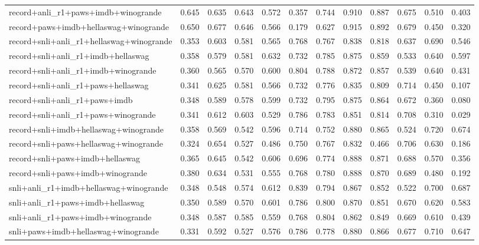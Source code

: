 \begin{table}[t]
\begin{tabular}{lrrrrrrrrrrr}
    record+anli\_r1+paws+imdb+winogrande & 0.645 & 0.635 & 0.643 & 0.572 & 0.357 & 0.744 & 0.910 & 0.887 & 0.675 & 0.510 & 0.403 \\
    record+paws+imdb+hellaswag+winogrande & 0.650 & 0.677 & 0.646 & 0.566 & 0.179 & 0.627 & 0.915 & 0.892 & 0.679 & 0.450 & 0.320 \\
    record+snli+anli\_r1+hellaswag+winogrande & 0.353 & 0.603 & 0.581 & 0.565 & 0.768 & 0.767 & 0.838 & 0.818 & 0.637 & 0.690 & 0.546 \\
    record+snli+anli\_r1+imdb+hellaswag & 0.358 & 0.579 & 0.581 & 0.632 & 0.732 & 0.785 & 0.875 & 0.859 & 0.533 & 0.640 & 0.597 \\
    record+snli+anli\_r1+imdb+winogrande & 0.360 & 0.565 & 0.570 & 0.600 & 0.804 & 0.788 & 0.872 & 0.857 & 0.539 & 0.640 & 0.431 \\
    record+snli+anli\_r1+paws+hellaswag & 0.341 & 0.625 & 0.581 & 0.566 & 0.732 & 0.776 & 0.835 & 0.809 & 0.714 & 0.450 & 0.107 \\
    record+snli+anli\_r1+paws+imdb & 0.348 & 0.589 & 0.578 & 0.599 & 0.732 & 0.795 & 0.875 & 0.864 & 0.672 & 0.360 & 0.080 \\
    record+snli+anli\_r1+paws+winogrande & 0.341 & 0.612 & 0.603 & 0.529 & 0.786 & 0.783 & 0.851 & 0.814 & 0.708 & 0.310 & 0.029 \\
    record+snli+imdb+hellaswag+winogrande & 0.358 & 0.569 & 0.542 & 0.596 & 0.714 & 0.752 & 0.880 & 0.865 & 0.524 & 0.720 & 0.674 \\
    record+snli+paws+hellaswag+winogrande & 0.324 & 0.654 & 0.527 & 0.486 & 0.750 & 0.767 & 0.832 & 0.466 & 0.706 & 0.630 & 0.186 \\
    record+snli+paws+imdb+hellaswag & 0.365 & 0.645 & 0.542 & 0.606 & 0.696 & 0.774 & 0.888 & 0.871 & 0.688 & 0.570 & 0.356 \\
    record+snli+paws+imdb+winogrande & 0.380 & 0.634 & 0.531 & 0.555 & 0.768 & 0.780 & 0.888 & 0.870 & 0.689 & 0.480 & 0.192 \\
    snli+anli\_r1+imdb+hellaswag+winogrande & 0.348 & 0.548 & 0.574 & 0.612 & 0.839 & 0.794 & 0.867 & 0.852 & 0.522 & 0.700 & 0.687 \\
    snli+anli\_r1+paws+imdb+hellaswag & 0.350 & 0.589 & 0.570 & 0.601 & 0.786 & 0.800 & 0.870 & 0.851 & 0.670 & 0.620 & 0.583 \\
    snli+anli\_r1+paws+imdb+winogrande & 0.348 & 0.587 & 0.585 & 0.559 & 0.768 & 0.804 & 0.862 & 0.849 & 0.669 & 0.610 & 0.439 \\
    snli+paws+imdb+hellaswag+winogrande & 0.331 & 0.592 & 0.527 & 0.576 & 0.786 & 0.778 & 0.880 & 0.866 & 0.677 & 0.710 & 0.647 \\

\end{tabular}
\end{table}
